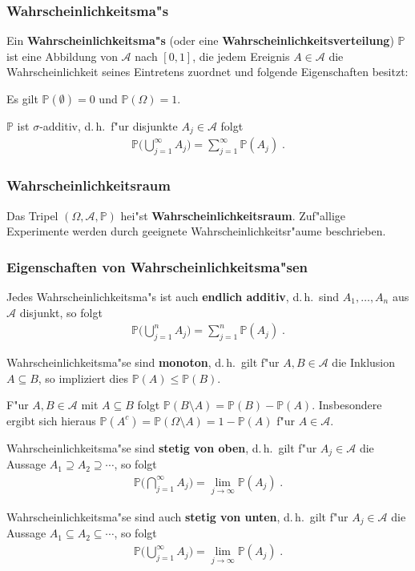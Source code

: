\documentclass[ngerman,draft,parskip=half,twoside]{scrartcl}
\newcommand*{\Algeb}{\mathcal{A}}   %
\newcommand*{\WKM}{\mathbb{P}}      %
\begin{document}
\subsubsection{Wahrscheinlichkeitsma"s}
Ein \textbf{Wahrscheinlichkeitsma"s} (oder eine \textbf{Wahrscheinlichkeitsverteilung})
 $\WKM$ ist eine Abbildung von
$\Algeb$ nach $[0,1]$, die jedem Ereignis $A\in \Algeb$ die Wahrscheinlichkeit seines
Eintretens zuordnet und folgende Eigenschaften besitzt:
\begin{eigenschaften}
 \item Es gilt $\WKM(\emptyset)=0$ und $\WKM(\Omega)=1$.
 \item $\WKM$ ist $\sigma$-additiv, d.\,h.~f"ur disjunkte $A_j\in\Algeb$ folgt
  \begin{gather*}
    \WKM\Big(\bigcup_{j=1}^\infty A_j\Big)=\sum_{j=1}^\infty\WKM(A_j)\;.
  \end{gather*}
\end{eigenschaften}
\subsubsection{Wahrscheinlichkeitsraum}
Das Tripel $(\Omega,\Algeb,\WKM)$ hei"st \textbf{Wahrscheinlichkeitsraum}. Zuf"allige
Experimente werden durch geeignete Wahrscheinlichkeitsr"aume  beschrieben.
\subsubsection{Eigenschaften von Wahrscheinlichkeitsma"sen}
\begin{eigenschaften}
 \item
Jedes Wahrscheinlichkeitsma"s ist auch \textbf{endlich additiv}, d.\,h.~sind
$A_1,\ldots,A_n$ aus $\Algeb$ disjunkt, so folgt
 \begin{gather*}
   \WKM\Big(\bigcup_{j=1}^n A_j\Big)=\sum_{j=1}^n\WKM(A_j)\;.
 \end{gather*}
 \item
Wahrscheinlichkeitsma"se sind \textbf{monoton}, d.\,h.~gilt f"ur $A,B\in\Algeb$ die Inklusion
$A\subseteq B$, so impliziert dies $\WKM(A)\le\WKM(B)$.
 \item
F"ur $A,B\in\Algeb$ mit $A\subseteq B$ folgt $\WKM(B\setminus A)=\WKM(B)-\WKM(A)$. Insbesondere ergibt sich hieraus
$\WKM(A^c)=\WKM(\Omega\setminus A)=1-\WKM(A)$ f"ur $A\in\Algeb$.
 \item
Wahrscheinlichkeitsma"se sind \textbf{stetig von oben}, d.\,h.~gilt f"ur $A_j\in\Algeb$
die Aussage $A_1\supseteq A_2\supseteq\cdots$,
so folgt
 \begin{gather*}
   \WKM\Big(\bigcap_{j=1}^\infty A_j\Big)=\lim_{j\to\infty}\WKM(A_j)\;.
 \end{gather*}
\item
Wahrscheinlichkeitsma"se sind auch \textbf{stetig von unten}, d.\,h.~gilt f"ur $A_j\in\Algeb$
die Aussage $A_1\subseteq A_2\subseteq\cdots$,
so folgt
  \begin{gather*}
    \WKM\Big(\bigcup_{j=1}^\infty A_j\Big)=\lim_{j\to\infty}\WKM(A_j)\;.
  \end{gather*}
\end{eigenschaften}
\end{document}
